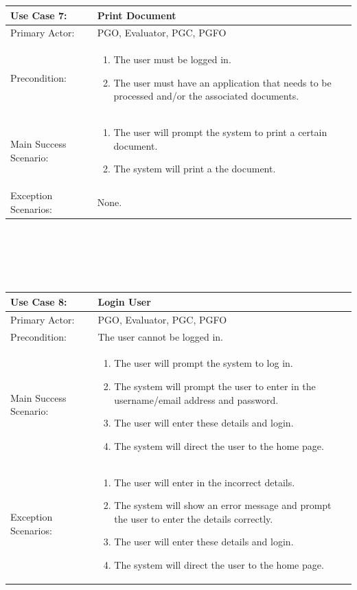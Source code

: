 \documentclass{article}
\begin{document}
\begin{tabular} {| m{5cm} | m{10cm} |}
\hline
Use Case 7: & Print Document \\
\hline
Primary Actor: & PGO, Evaluator, PGC, PGFO \\
\hline
Precondition: & \begin{enumerate} \itemsep0em \item The user must be logged in. 
\item The user must have an application that needs to be processed and/or the associated documents.
\end{enumerate} \\
\hline
Main Success Scenario: & \begin{enumerate} \itemsep0em \item The user will prompt the system to print a certain document.
\item The system will print a the document.
\end{enumerate}\\
\hline
Exception Scenarios: & None. \\
\hline
\end{tabular}
\\ \\ \\ \\
\begin{tabular} {| m{5cm} | m{10cm} |}
\hline
Use Case 8: & Login User \\
\hline
Primary Actor: & PGO, Evaluator, PGC, PGFO \\
\hline
Precondition: & The user cannot be logged in.  \\
\hline
Main Success Scenario: & \begin{enumerate} \itemsep0em \item The user will prompt the system to log in.
\item The system will prompt the user to enter in the username/email address and password.
\item The user will enter these details and login.
\item The system will direct the user to the home page.
\end{enumerate}\\
\hline
Exception Scenarios: & \begin{enumerate} \itemsep0em \item The user will enter in the incorrect details.
\item The system will show an error message and prompt the user to enter the details correctly.
\item The user will enter these details and login.
\item The system will direct the user to the home page.
\end{enumerate}\\
\hline
\end{tabular}
\end{document}
